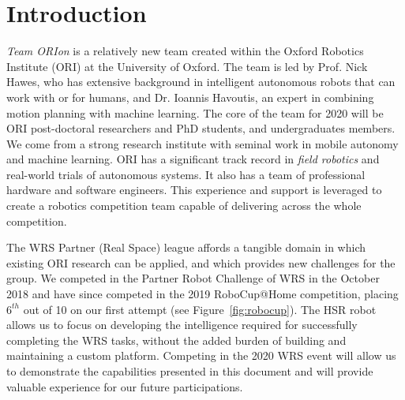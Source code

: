 \documentclass[runningheads,a4paper]{llncs}
\newcommand{\teamori}{Team ORIon}
\begin{document}

\section{Introduction}

\textit{\teamori{}} is a relatively new team created within the Oxford Robotics Institute
(ORI) at the University of Oxford. The team is led by Prof. Nick Hawes, who has extensive background in intelligent autonomous robots that can work with or for humans, and Dr. Ioannis Havoutis, an expert in combining motion planning with machine learning. The core of the team for 2020 will be ORI post-doctoral researchers and PhD students, and undergraduates members. We come from a strong research institute with seminal work in mobile autonomy and machine learning. ORI has a significant track record in \emph{field robotics} and real-world trials of autonomous systems. It also has a team of professional
hardware and software engineers. This experience and support is leveraged
to create a robotics competition team capable of delivering across the whole
competition. 

The WRS Partner (Real Space) league affords a tangible domain in
which existing ORI research can be applied, and which provides new challenges
for the group. We competed in the Partner Robot Challenge of WRS in the October 2018 and have since competed in the 2019 RoboCup@Home competition, placing $6^{th}$ out of 10 on our first attempt (see Figure~\ref{fig:robocup}). 
The HSR robot allows us to focus on developing the
intelligence required for successfully completing the WRS tasks, 
without the added burden of building and maintaining a custom platform. 
Competing in the 2020 WRS event will allow us to demonstrate 
the capabilities presented in this document and will provide valuable experience
for our future participations.
\end{document}
